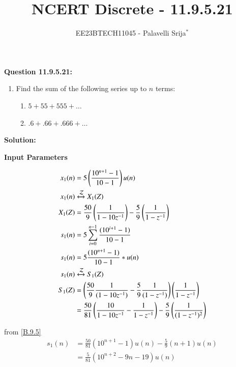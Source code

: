 \documentclass[journal,12pt,twocolumn]{IEEEtran}
\theoremstyle{remark}
\begin{document}


\title{NCERT Discrete - 11.9.5.21}
\author{EE23BTECH11045 - Palavelli Srija$^{*}$}

\maketitle

\newpage
\bigskip

\renewcommand{\thefigure}{\theenumi}
\renewcommand{\thetable}{\theenumi}

\vspace{3cm}
\textbf{Question 11.9.5.21:} 
\begin{enumerate}
  \item Find the sum of the following series up to $n$ terms:
  \begin{enumerate}
    \item $5 + 55 + 555 + \ldots$
    \item $.6 + .66 + .666 + \ldots$
  \end{enumerate}
\end{enumerate}

\textbf{Solution:}
\begin{table}[h!]
    \centering
    
    \caption{\textbf{Input Parameters}}
    \label{tab:table_sr5}
\end{table} 

\begin{align}
x_1(n) &= 5\left(\frac{10^{n+1}-1}{10-1}\right)u(n)\\
x_1(n) & \xleftrightarrow{\mathcal{Z}} X_1(Z)\\
X_1(Z) &= \frac{50}{9}\left(\frac{1}{1-10z^{-1}}\right)-\frac{5}{9}\left(\frac{1}{1-z^{-1}}\right)\\
s_1(n) &= 5  \sum_{i=0}^{n-1} \frac{(10^{i+1} -1)}{10-1}\\
s_1(n) &= 5\frac{(10^{n+1}-1)}{10-1}*u(n)\\
s_1(n) & \xleftrightarrow{\mathcal{Z}} S_1(Z)\\
S_1(Z) &= \left(\frac{50}{9}\frac{1}{(1-10z^{-1})}-\frac{5}{9}\frac{1}{(1-z^{-1})}\right)\left(\frac{1}{1-z^{-1}}\right)\\
       &=\frac{50}{81}\left(\frac{10}{1-10z^{-1}}-\frac{1}{1-z^{-1}}\right)-\frac{5}{9}\left(\frac{1}{(1-z^{-1})^2}\right)\\
\end{align}

from \eqref{B.9.5}
\begin{align}
s_1(n) &=\frac{50}{81}(10^{n+1}-1)u(n)-\frac{5}{9}(n+1)u(n)\\
       &=\frac{5}{81}(10^{n+2}-9n-19)u(n)       
\end{align}
\end{document}
